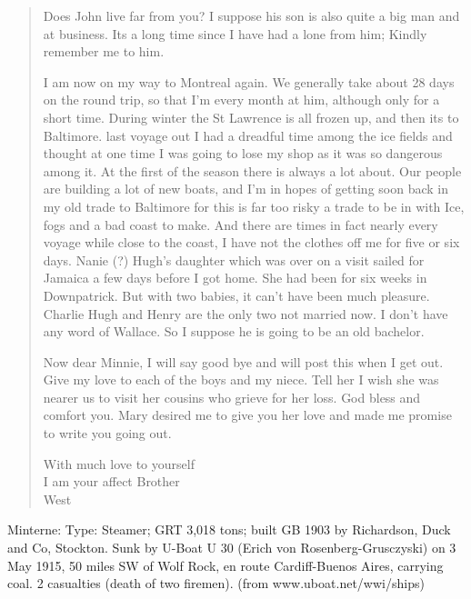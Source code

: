 \begin{quotation}
Does John live far from you? I suppose his son is also quite a big man and at business. Its a long time since I have had a lone from him; Kindly remember me to him.

I am now on my way to Montreal again. We generally take about 28 days on the round trip, so that I'm every month at him, although only for a short time. During winter the St Lawrence is all frozen up, and then its to Baltimore. last voyage out I had a dreadful time among the ice fields and thought at one time I was going to lose my shop as it was so dangerous among it. At the first of the season there is always a lot about. Our people are building a lot of new boats, and I'm in hopes of getting soon back in my old trade to Baltimore for this is far too risky a trade to be in with Ice, fogs and a bad coast to make. And there are times in fact nearly every voyage while close to the coast, I have not the clothes off me for five or six days. Nanie (?) Hugh's daughter which was over on a visit sailed for Jamaica a few days before I got home. She had been for six weeks in Downpatrick. But with two babies, it can't have been much pleasure. Charlie Hugh and Henry are the only two not married now. I don't have any word of Wallace. So I suppose he is going to be an old bachelor.

Now dear Minnie, I will say good bye and will post this when I get out. Give my love to each of the boys and my niece. Tell her I wish she was nearer us to visit her cousins who grieve for her loss. God bless and comfort you. Mary desired me to give you her love and made me promise to write you going out.

With much love to yourself \\
I am your affect Brother \\
West 
\end{quotation}

Minterne: Type: Steamer; GRT 3,018 tons; built GB 1903 by Richardson, Duck and Co, Stockton. Sunk by U-Boat U 30 (Erich von Rosenberg-Grusczyski) on 3 May 1915, 50 miles SW of Wolf Rock, en route Cardiff-Buenos Aires, carrying coal. 2 casualties (death of two firemen). (from www.uboat.net/wwi/ships)

